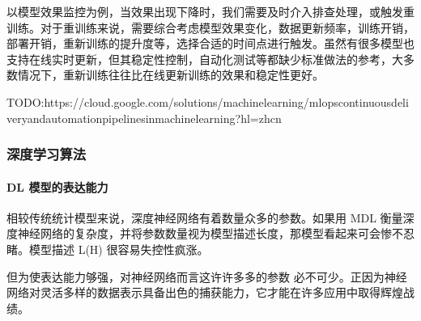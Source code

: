 \documentclass[letterpaper,10pt,english]{sphinxmanual}
\begin{document}
以模型效果监控为例，当效果出现下降时，我们需要及时介入排查处理，或触发重训练。对于重训练来说，需要综合考虑模型效果变化，数据更新频率，训练开销，部署开销，重新训练的提升度等，选择合适的时间点进行触发。虽然有很多模型也支持在线实时更新，但其稳定性控制，自动化测试等都缺少标准做法的参考，大多数情况下，重新训练往往比在线更新训练的效果和稳定性更好。

TODO:https://cloud.google.com/solutions/machine\sphinxhyphen{}learning/mlops\sphinxhyphen{}continuous\sphinxhyphen{}delivery\sphinxhyphen{}and\sphinxhyphen{}automation\sphinxhyphen{}pipelines\sphinxhyphen{}in\sphinxhyphen{}machine\sphinxhyphen{}learning?hl=zh\sphinxhyphen{}cn


\subsubsection{深度学习算法}
\label{\detokenize{chapter_AI_dive/DL:id1}}\label{\detokenize{chapter_AI_dive/DL::doc}}

\paragraph{DL 模型的表达能力}
\label{\detokenize{chapter_AI_dive/DL:dl}}
相较传统统计模型来说，深度神经网络有着数量众多的参数。如果用 MDL
衡量深度神经网络的复杂度，并将参数数量视为模型描述长度，那模型看起来可会惨不忍睹。模型描述
L(H) 很容易失控性疯涨。

但为使表达能力够强，对神经网络而言这许许多多的参数
必不可少。正因为神经网络对灵活多样的数据表示具备出色的捕获能力，它才能在许多应用中取得辉煌战绩。%
\begin{footnote}[941]\sphinxAtStartFootnote
{}
%
\end{footnote}
\end{document}
